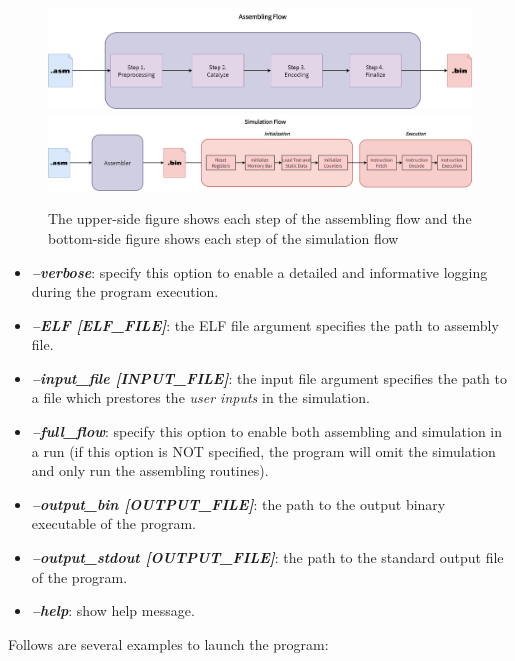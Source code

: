 \documentclass[conference, draftclsnofoot, letterpaper]{IEEETran}
\begin{document}
\begin{figure}
	\centering
	\includegraphics[width=.9\linewidth]{asm_flow}
	\includegraphics[width=\linewidth]{sim_flow}
	\caption{The upper-side figure shows each step of the assembling flow and the bottom-side figure shows each step of the simulation flow}
	\label{fig::flow}
\end{figure}

\begin{tcolorbox}
	\footnotesize
\begin{itemize}\itemsep .5em
	\item \textit{\textbf{--verbose}}: specify this option to enable a detailed and informative logging during the program execution. 
	\item \textit{\textbf{--ELF [ELF\_FILE]}}: the ELF file argument specifies the path to assembly file.
	\item \textit{\textbf{--input\_file [INPUT\_FILE]}}: the input file argument specifies the path to a file which prestores the \emph{user inputs} in the simulation. 
	\item \textit{\textbf{--full\_flow}}: specify this option to enable both assembling and simulation in a run (if this option is NOT specified, the program will omit the simulation and only run the assembling routines).
	\item \textit{\textbf{--output\_bin [OUTPUT\_FILE]}}: the path to the output binary executable of the program. 
	\item \textit{\textbf{--output\_stdout [OUTPUT\_FILE]}}: the path to the standard output file of the program. 
	\item \textit{\textbf{--help}}: show help message.
\end{itemize}
\end{tcolorbox}


Follows are several examples to launch the program:
	
\end{document}
